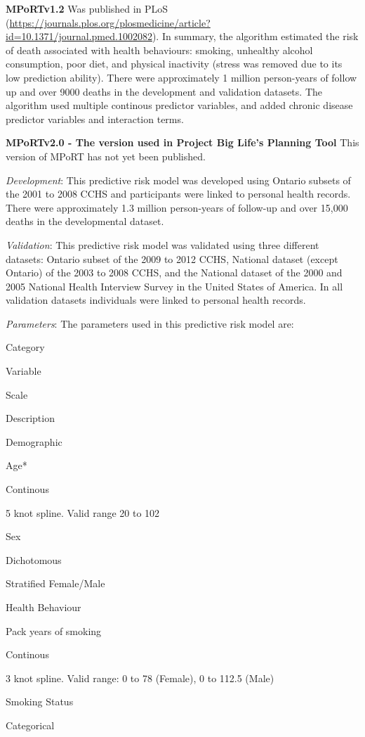 \documentclass[]{book}
\begin{document}
\textbf{MPoRTv1.2} Was published in PLoS
(\url{https://journals.plos.org/plosmedicine/article?id=10.1371/journal.pmed.1002082}).
In summary, the algorithm estimated the risk of death associated with
health behaviours: smoking, unhealthy alcohol consumption, poor diet,
and physical inactivity (stress was removed due to its low prediction
ability). There were approximately 1 million person-years of follow up
and over 9000 deaths in the development and validation datasets. The
algorithm used multiple continous predictor variables, and added chronic
disease predictor variables and interaction terms.

\textbf{MPoRTv2.0 - The version used in Project Big Life's Planning
Tool} This version of MPoRT has not yet been published.

\emph{Development}: This predictive risk model was developed using
Ontario subsets of the 2001 to 2008 CCHS and participants were linked to
personal health records. There were approximately 1.3 million
person-years of follow-up and over 15,000 deaths in the developmental
dataset.

\emph{Validation}: This predictive risk model was validated using three
different datasets: Ontario subset of the 2009 to 2012 CCHS, National
dataset (except Ontario) of the 2003 to 2008 CCHS, and the National
dataset of the 2000 and 2005 National Health Interview Survey in the
United States of America. In all validation datasets individuals were
linked to personal health records.

\emph{Parameters}: The parameters used in this predictive risk model
are:

Category

Variable

Scale

Description

Demographic

Age*

Continous

5 knot spline. Valid range 20 to 102

Sex

Dichotomous

Stratified Female/Male

Health Behaviour

Pack years of smoking

Continous

3 knot spline. Valid range: 0 to 78 (Female), 0 to 112.5 (Male)

Smoking Status

Categorical
\end{document}
